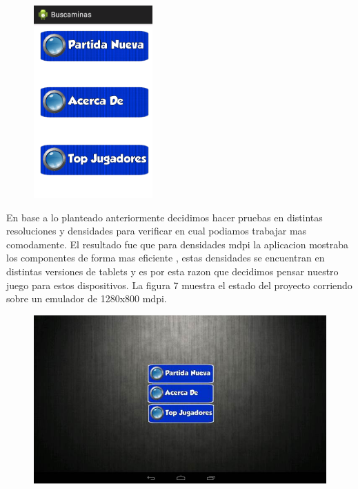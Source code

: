 \documentclass[11pt]{article} %
\begin{document}
\begin{figure}[H]
 \begin{center}
    \includegraphics{imagenes_Documentacion/AvanceTres}
\end{center}
\caption {}
\label{Avance Tres}
\end{figure}

En base a lo planteado anteriormente decidimos hacer pruebas en distintas resoluciones y densidades para verificar en cual podiamos trabajar mas comodamente. El resultado fue que para densidades mdpi la aplicacion mostraba los componentes de forma mas eficiente , estas densidades se encuentran en distintas versiones de tablets y es por esta razon que decidimos pensar nuestro juego para estos dispositivos. La figura 7 muestra el estado del proyecto corriendo sobre un emulador de 1280x800 mdpi.

\begin{figure}[H]
 \begin{center}
    \includegraphics{imagenes_Documentacion/fig1}
\end{center}
\caption {}
\label{Avance Cuatro}
\end{figure}
\end{document}

